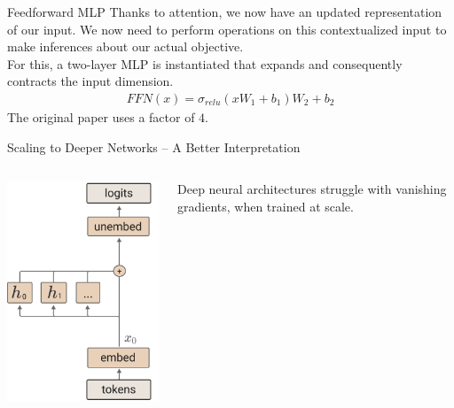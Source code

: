 \documentclass{beamer}
\begin{document}
\begin{frame}{Feedforward MLP}
	Thanks to attention, we now have an updated representation of our input. We now need to perform operations on this contextualized input to make inferences about our actual objective. \pause \newline \\

	For this, a two-layer MLP is instantiated that expands and consequently contracts the input dimension.
	\begin{gather}
		FFN(x) = \sigma_{relu}(xW_1 + b_1)W_2 + b_2
	\end{gather}
	The original paper uses a factor of $4$.
\end{frame}

\begin{frame}{Scaling to Deeper Networks -- A Better Interpretation}
	\begin{columns}
		\begin{column}{.35\textwidth}
			\begin{center}
				\includegraphics[width=\textwidth]{img/circuit-arch.png}
			\end{center}
		\end{column}
		\begin{column}{.5\textwidth}
			Deep neural architectures struggle with vanishing gradients, when trained at scale. \pause \newline \\


\end{column}
\end{columns}
\end{frame}
\end{document}
